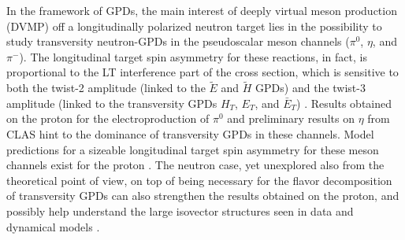 \documentclass[a4paper,12pt]{report}
\begin{document}
In the framework of GPDs, the main interest of deeply virtual meson production (DVMP) off a longitudinally polarized neutron target lies in the possibility to study transversity neutron-GPDs in the pseudoscalar meson channels ($\pi^0$, $\eta$, and $\pi^-$). The longitudinal target spin asymmetry for these reactions, in fact, is proportional to the LT interference part of the cross section, which is sensitive to both the twist-2 amplitude (linked to the $\tilde{E}$ and $\tilde{H}$ GPDs) and the twist-3 amplitude (linked to the transversity GPDs $H_T$, $E_T$, and $\bar{E}_T$) \cite{gk_transverse}. Results obtained on the proton for the electroproduction of $\pi^0$ \cite{ivan_prl} and preliminary results on $\eta$ from CLAS \cite{ivan_private} hint to the dominance of transversity GPDs in these channels. Model predictions for a sizeable longitudinal target spin asymmetry for these meson channels exist for the proton \cite{gk_lt_asym}. The neutron case, yet unexplored also from the theoretical point of view, on top of being necessary for the flavor decomposition of transversity GPDs can also strengthen the results obtained on the proton, and possibly help understand the large isovector structures seen in data and dynamical models \cite{weiss}. 
\newpage
\end{document}
